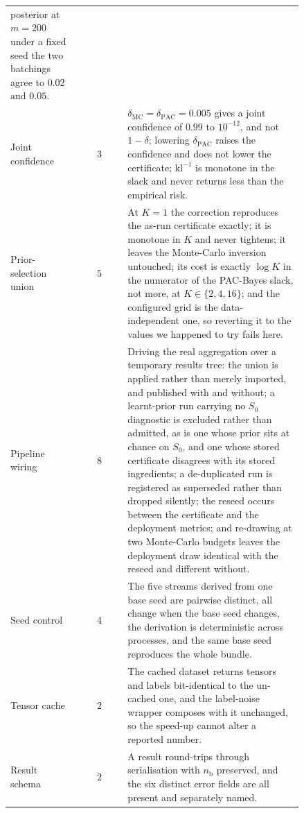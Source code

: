 {\begin{longtable}[]{@{}p{0.24\linewidth} c p{0.60\linewidth}@{}}
  posterior at $m=200$ under a fixed seed the two batchings agree to $0.02$
  and $0.05$. \\[2pt]
Joint confidence & $3$ &
  $\delta_{\mathrm{MC}}=\delta_{\mathrm{PAC}}=0.005$ gives a joint confidence of
  $0.99$ to $10^{-12}$, and not $1-\delta$; lowering $\delta_{\mathrm{PAC}}$
  raises the confidence and does not lower the certificate; $\mathrm{kl}^{-1}$
  is monotone in the slack and never returns less than the empirical risk. \\[2pt]
Prior-selection union & $5$ &
  At $K=1$ the correction reproduces the as-run certificate exactly; it is
  monotone in $K$ and never tightens; it leaves the Monte-Carlo inversion
  untouched; its cost is exactly $\log K$ in the numerator of the PAC-Bayes
  slack, not more, at $K\in\{2,4,16\}$; and the configured grid is the
  data-independent one, so reverting it to the values we happened to try
  fails here. \\[2pt]
Pipeline wiring & $8$ &
  Driving the real aggregation over a temporary results tree: the union is
  applied rather than merely imported, and published with and without; a
  learnt-prior run carrying no $S_0$ diagnostic is excluded rather than admitted,
  as is one whose prior sits at chance on $S_0$, and one whose stored certificate
  disagrees with its stored ingredients; a de-duplicated run is registered as
  superseded rather than dropped silently; the reseed occurs between the
  certificate and the deployment metrics; and re-drawing at two Monte-Carlo
  budgets leaves the deployment draw identical with the reseed and different
  without. \\[2pt]
Seed control & $4$ &
  The five streams derived from one base seed are pairwise distinct, all
  change when the base seed changes, the derivation is deterministic across
  processes, and the same base seed reproduces the whole bundle. \\[2pt]
Tensor cache & $2$ &
  The cached dataset returns tensors and labels bit-identical to the
  un-cached one, and the label-noise wrapper composes with it unchanged, so
  the speed-up cannot alter a reported number. \\[2pt]
Result schema & $2$ &
  A result round-trips through serialisation with $n_{\mathrm b}$ preserved, and
  the six distinct error fields are all present and separately named. \\
\end{longtable}}
